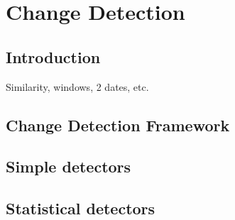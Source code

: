 \chapter{Change Detection}
\section{Introduction}
Similarity, windows, 2 dates, etc.
\section{Change Detection Framework}
\section{Simple detectors}
\section{Statistical detectors}
